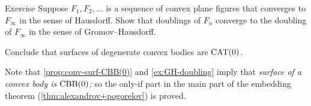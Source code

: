 \begin{thm}{Exercise}\label{ex:GH-doubling}
Suppose $F_1,F_2,\dots$ is a sequence of convex plane figures that converges to $F_\infty$ in the sense of Hausdorff.
Show that doublings of $F_n$ converge to the doubling of $F_\infty$ in the sense of Gromov--Hausdorff.

Conclude that surfaces of degenerate convex bodies are $\mathrm{CAT}(0)$.
\end{thm}

Note that \ref{prop:conv-surf-CBB(0)} and \ref{ex:GH-doubling} imply that
\textit{surface of a convex body is $\mathrm{CBB}(0)$;}
so the only-if part in the main part of the embedding theorem (\ref{thm:alexandrov+pogorelov}) is proved.
